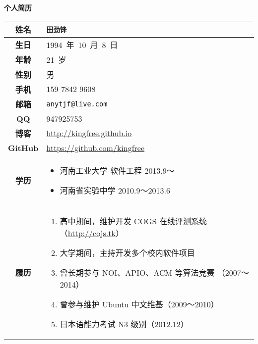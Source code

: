 \documentclass[11pt,a4paper,nofonts]{ctexart}
\def\tjf{{\tt{田劲锋}}}
\def\titlec{个人简历}
\begin{document}
\newcommand{\thh}[1]{{\bf{#1}}}
\CTEXnoindent

\begin{center}
{\Large\bf\titlec}

\vspace{0.5cm}

\begin{tabular}{|c|l|}\hline
\thh{姓名} & {\tjf} \\\hline
\thh{生日} & {1994~年~10~月~8~日} \\\hline
\thh{年龄} & {21~岁} \\\hline
\thh{性别} & {男} \\\hline
\thh{手机} & {159 7842 9608} \\\hline
\thh{邮箱} & {\tt anytjf@live.com} \\\hline
\thh{QQ} & {947925753} \\\hline
\thh{博客} & {\url{http://kingfree.github.io}} \\\hline
\thh{GitHub} & {\url{https://github.com/kingfree}} \\\hline
\thh{学历} & {\begin{minipage}[c][4em]{12cm}
\begin{itemize}
\item 河南工业大学 软件工程 2013.9～
\item 河南省实验中学 2010.9～2013.6
\end{itemize}
\end{minipage}} \\\hline
\thh{履历} & {\begin{minipage}[c][9em]{12cm}
\begin{enumerate}
\item 高中期间，维护开发 COGS 在线评测系统（\url{http://cojs.tk}）
\item 大学期间，主持开发多个校内软件项目
\item 曾长期参与 NOI、APIO、ACM 等算法竞赛 （2007～2014）
\item 曾参与维护 Ubuntu 中文维基（2009～2010）
\item 日本语能力考试 N3 级别（2012.12）
\end{enumerate}
\end{minipage}} \\\hline

\end{tabular}
\end{center}
\end{document}
